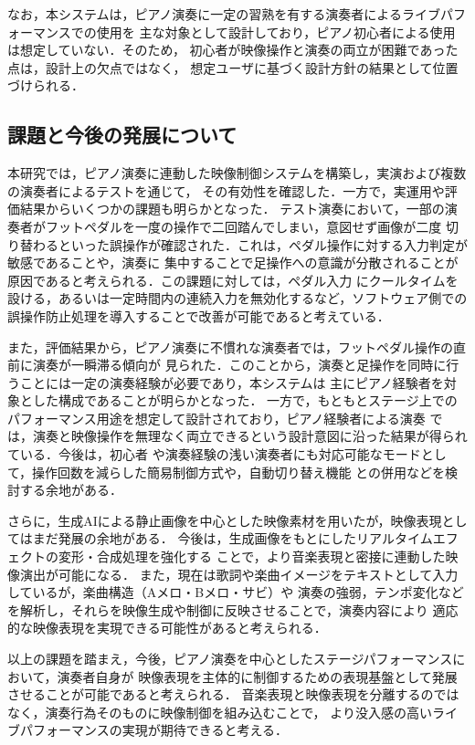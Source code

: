 なお，本システムは，ピアノ演奏に一定の習熟を有する演奏者によるライブパフォーマンスでの使用を
主な対象として設計しており，ピアノ初心者による使用は想定していない．そのため，
初心者が映像操作と演奏の両立が困難であった点は，設計上の欠点ではなく，
想定ユーザに基づく設計方針の結果として位置づけられる．


\subsection{課題と今後の発展について }
本研究では，ピアノ演奏に連動した映像制御システムを構築し，実演および複数の演奏者によるテストを通じて，
その有効性を確認した．一方で，実運用や評価結果からいくつかの課題も明らかとなった．
テスト演奏において，一部の演奏者がフットペダルを一度の操作で二回踏んでしまい，意図せず画像が二度
切り替わるといった誤操作が確認された．これは，ペダル操作に対する入力判定が敏感であることや，演奏に
集中することで足操作への意識が分散されることが原因であると考えられる．この課題に対しては，ペダル入力
にクールタイムを設ける，あるいは一定時間内の連続入力を無効化するなど，ソフトウェア側での
誤操作防止処理を導入することで改善が可能であると考えている．

また，評価結果から，ピアノ演奏に不慣れな演奏者では，フットペダル操作の直前に演奏が一瞬滞る傾向が
見られた．このことから，演奏と足操作を同時に行うことには一定の演奏経験が必要であり，本システムは
主にピアノ経験者を対象とした構成であることが明らかとなった．
一方で，もともとステージ上でのパフォーマンス用途を想定して設計されており，ピアノ経験者による演奏
では，演奏と映像操作を無理なく両立できるという設計意図に沿った結果が得られている．今後は，初心者
や演奏経験の浅い演奏者にも対応可能なモードとして，操作回数を減らした簡易制御方式や，自動切り替え機能
との併用などを検討する余地がある．

さらに，生成AIによる静止画像を中心とした映像素材を用いたが，映像表現としてはまだ発展の余地がある．
今後は，生成画像をもとにしたリアルタイムエフェクトの変形・合成処理を強化する
ことで，より音楽表現と密接に連動した映像演出が可能になる．
また，現在は歌詞や楽曲イメージをテキストとして入力しているが，楽曲構造（Aメロ・Bメロ・サビ）や
演奏の強弱，テンポ変化などを解析し，それらを映像生成や制御に反映させることで，演奏内容により
適応的な映像表現を実現できる可能性があると考えられる．

以上の課題を踏まえ，今後，ピアノ演奏を中心としたステージパフォーマンスにおいて，演奏者自身が
映像表現を主体的に制御するための表現基盤として発展させることが可能であると考えられる．
音楽表現と映像表現を分離するのではなく，演奏行為そのものに映像制御を組み込むことで，
より没入感の高いライブパフォーマンスの実現が期待できると考える．


